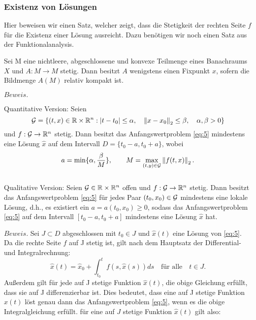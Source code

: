\subsubsection{Existenz von Lösungen}
Hier beweisen wir einen Satz, welcher zeigt, dass die Stetigkeit der rechten Seite $f$ für die Existenz einer
Lösung ausreicht. Dazu benötigen wir noch einen Satz aus der Funktionalanalysis.
\begin{satz}
    Sei M eine nichtleere, abgeschlossene und konvexe Teilmenge eines Banachraums $X$ und $A:M \rightarrow M$ stetig.
    Dann besitzt $A$ wenigstens einen Fixpunkt $x$, sofern die Bildmenge $A(M)$ relativ kompakt ist.
\end{satz}
$Beweis.$ \cite[13,14]{sundermeierFixpunktsatzSchauder}
\begin{satz}
    Quantitative Version: Seien
    \[
        {\cal G}=\{(t,x) \in \mathbb{R} \times \mathbb{R}^{n}: |t-t_{0}| \leq \alpha, \quad
        \left\lVert x-x_{0} \right\rVert _{2} \leq\beta, \quad \alpha,\beta > 0 \}
    \]
    und $f:{\cal G} \rightarrow \mathbb{R}^{n}$ stetig. Dann besitzt das Anfangswertproblem \eqref{eq:5}
    mindestens eine Lösung $\hat{x}$ auf dem Intervall $D=\{t_{0}-a,t_{0}+a\}$, wobei
    \[
        a=\min\{\alpha, \frac{\beta}{M}\}, \qquad M= \max_{(t,y)\in {\cal G}}\left\lVert f(t,x)\right\rVert_{2}.
    \]\\
    Qualitative Version: Seien ${\cal G}\in \mathbb{R} \times \mathbb{R}^{n}$ offen und $f:{\cal G} \rightarrow \mathbb{R}^{n}$ stetig.
    Dann besitzt das Anfangswertproblem \eqref{eq:5} für jedes Paar $(t_{0},x_{0}) \in {\cal G}$ mindestens eine
    lokale Lösung, d.h., es existiert ein $a=a(t_{0},x_{0}) \geq 0$, sodass das Anfangswertproblem \eqref{eq:5} auf
    dem Intervall $[t_{0}-a,t_{0}+a]$ mindestens eine Lösung $\hat{x}$ hat.
\end{satz}
$Beweis.$ Sei $J\subset D$ abgeschlossen mit $t_0 \in J$ und $\hat{x}(t)$ eine Lösung von \eqref{eq:5}. Da die rechte
Seite $f$ auf J stetig ist, gilt nach dem Hauptsatz der Differential- und Integralrechnung:
\[
    \hat{x}(t) = \hat{x}_0 + \int_{t_0}^{t} f(s, \hat{x}(s)) ds \quad \text{für alle} \quad t \in J.
\]
Außerdem gilt für jede auf J stetige Funktion $\hat{x}(t)$, die obige Gleichung erfüllt, dass sie auf J differenzierbar
ist. Dies bedeutet, dass eine auf J stetige Funktion $\hat{x}(t)$ löst genau dann das Anfangswertproblem \eqref{eq:5},
wenn es die obige Integralgleichung erfüllt.
für eine auf $J$ stetige Funktion $\hat{x}(t)$ gilt also:
